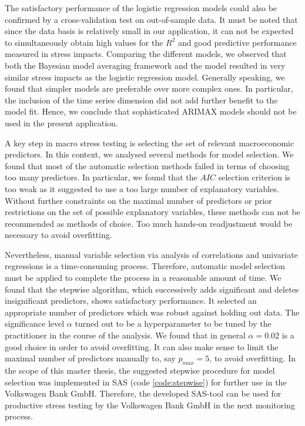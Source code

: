 \documentclass[a4paper, 12pt]{scrreprt}
\begin{document}
The satisfactory performance of the logistic regression models could also be confirmed by a cross-validation test on out-of-sample data.
It must be noted that since the data basis is relatively small in our application, it can not be expected to simultaneously obtain high values for the $R^2$ and good predictive performance measured in stress impacts.
Comparing the different models, we observed that both the Bayesian model averaging framework and the \textcite{wilson1997wilsonI} model resulted in very similar stress impacts as the logistic regression model.
Generally speaking, we found that simpler models are preferable over more complex ones. In particular, the inclusion of the time series dimension did not add further benefit to the model fit. Hence, we conclude that sophisticated ARIMAX models should not be used in the present application. 

A key step in macro stress testing is selecting the set of relevant macroeconomic predictors. In this context, we analysed several methods for model selection. We found that most of the automatic selection methods failed in terms of choosing too many predictors. In particular, we found that the $AIC$ selection criterion is too weak as it suggested to use a too large number of explanatory variables. Without further constraints on the maximal number of predictors or prior restrictions on the set of possible explanatory variables, these methods can not be recommended as methods of choice. Too much hands-on readjustment would be necessary to avoid overfitting. 

Nevertheless, manual variable selection via analysis of correlations and univariate regressions is a time-consuming process. Therefore, automatic model selection must be applied to complete the process in a reasonable amount of time.
We found that the stepwise algorithm, which successively adds significant and deletes insignificant predictors, shows satisfactory performance. It selected an appropriate number of predictors which was robust against holding out data. The significance level $\alpha$ turned out to be a hyperparameter to be tuned by the practitioner in the course of the analysis. We found that in general $\alpha = 0.02$ is a good choice in order to avoid overfitting.
It can also make sense to limit the maximal number of predictors manually to, say $p_{max} = 5$, to avoid overfitting. In the scope of this master thesis, the suggested stepwise procedure for model selection was implemented in SAS (code \ref{code:stepwise}) for further use in the Volkswagen Bank GmbH. Therefore, the developed SAS-tool can be used for productive stress testing by the Volkswagen Bank GmbH in the next monitoring process.
\end{document}
